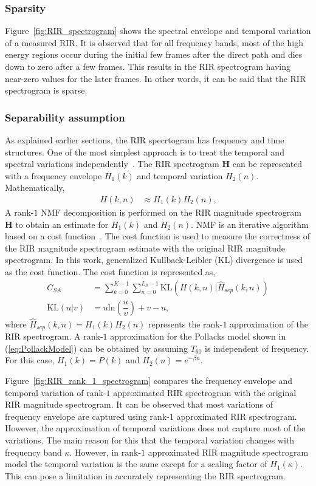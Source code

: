 \subsubsection{Sparsity}
Figure~\ref{fig:RIR_spectrogram} shows the spectral envelope and temporal variation of a measured RIR.  It is observed that for all frequency bands, most of the high energy regions occur during the initial few frames after the direct path and dies down to zero after a few frames. This results in the RIR spectrogram having near-zero values for the later frames. In other words, it can be said that the RIR spectrogram is sparse. 

\subsubsection{Separability assumption}
\label{sec:Separability_assumption}
As explained earlier sections, the RIR specrtogram has frequency and time structures. One of the most simplest approach is to treat the temporal and spectral variations independently~\cite{mohanan201a}. The RIR spectrogram $\mathbf{H}$ can be represented with a frequency envelope $H_1(k)$ and temporal variation $H_2(n)$. Mathematically,
\begin{align}
H(k,n) &\approx H_1(k)H_2(n) \text{,}
\end{align}
A rank-$1$ NMF decomposition is performed on the RIR magnitude spectrogram $\mathbf{H}$ to obtain an estimate for $H_1(k)$ and $H_2(n)$. NMF is an iterative algorithm based on a cost function~\cite{lee99}. The cost function is used to measure the correctness of the RIR magnitude spectrogram estimate with the original RIR magnitude spectrogram. In this work, generalized Kullback-Leibler (KL) divergence is used as the cost function. The cost function is represented as,   
\begin{align}
C_{SA} &= \sum_{k = 0}^{K-1}\sum_{n=0}^{L_h-1}\text{KL} (H(k,n)|\hat{H}_{sep}(k,n)) \nonumber \\
\text{KL}(u|v) &= u\text{ln}(\dfrac{u}{v}) + v - u,
\label{eq:KLdiv}
\end{align} 
where $\hat{H}_{sep}(k,n)=H_1(k)H_2(n)$ represents the rank-$1$ approximation of the RIR spectrogram.  A rank-$1$ approximation for the Pollacks model shown in (\ref{eq:PollackModel}) can be obtained by assuming $T_{60}$ is independent of frequency. For this case, $H_1(k) = P(k)$ and $H_2(n)=e^{-\beta n}$.

Figure~\ref{fig:RIR_rank_1_spectrogram} compares the frequency envelope and temporal variation of rank-$1$ approximated RIR spectrogram with the original RIR magnitude spectrogram. It can be observed that most variations of frequency envelope are captured using rank-$1$ approximated  RIR spectrogram. However, the approximation of temporal variations does not capture most of the variations. The main reason for this that the temporal variation changes with frequency band $\kappa$. However, in rank-$1$ approximated RIR magnitude spectrogram model the temporal variation is the same except for a scaling factor of $H_1(\kappa)$. This can pose a limitation in accurately representing the RIR spectrogram.   

